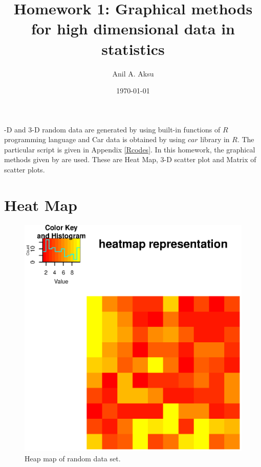 \documentclass[11pt]{amsart}
\title{Homework 1: Graphical methods for high dimensional data in statistics }
\author{Anil A. Aksu }
\date{\today}
\begin{document}
-D and 3-D random data are generated by using built-in functions of $R$ programming language and Car data is obtained by using $car$ library in $R$. The particular script is given in Appendix \ref{Rcodes}. In this homework, the graphical methods given by \cite{Grinstein2001} are used. These are Heat Map, 3-D scatter plot and Matrix of scatter plots. 
\section*{\bf{Heat Map}}
\begin{figure}[H]
\centering
 \includegraphics[scale=0.7]{Heatmap}%
  \caption{Heap map of random data set. }
\label{fig:Heatmap}
\end{figure} 

\newpage
\end{document}
